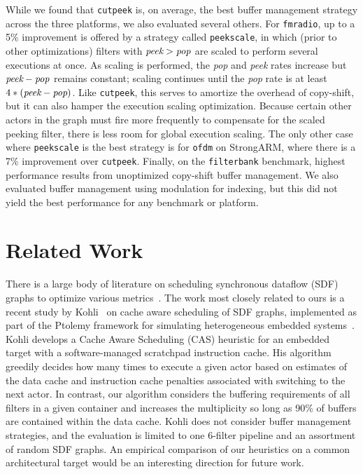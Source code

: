 \documentclass{sigplanconf}
\begin{document}
While we found that {\tt cutpeek} is, on average, the best buffer
management strategy across the three platforms, we also evaluated
several others.  For {\tt fmradio}, up to a 5\% improvement is offered
by a strategy called {\tt peekscale}, in which (prior to other
optimizations) filters with $\mbox{\it peek}>\mbox{\it pop}$ are
scaled to perform several executions at once.  As scaling is
performed, the {\it pop} and {\it peek} rates increase but $\mbox{{\it
peek}} - \mbox{\it pop}$ remains constant; scaling continues until the
{\it pop} rate is at least $4*(\mbox{{\it peek}} - \mbox{{\it pop}})$.
Like {\tt cutpeek}, this serves to amortize the overhead of
copy-shift, but it can also hamper the execution scaling optimization.
Because certain other actors in the graph must fire more frequently to
compensate for the scaled peeking filter, there is less room for
global execution scaling.  The only other case where {\tt peekscale}
is the best strategy is for {\tt ofdm} on StrongARM, where there is a
7\% improvement over {\tt cutpeek}.  Finally, on the {\tt filterbank}
benchmark, highest performance results from unoptimized copy-shift
buffer management.  We also evaluated buffer management using
modulation for indexing, but this did not yield the best performance
for any benchmark or platform.

\section{Related Work}
\label{sec:related-work}

There is a large body of literature on scheduling synchronous dataflow
(SDF) graphs to optimize various
metrics~\cite{bhattacharyya99synthesis,leesdf}.  The work most closely
related to ours is a recent study by Kohli~\cite{kohli04} on
cache aware scheduling of SDF graphs, implemented as part of the
Ptolemy framework for simulating heterogeneous embedded
systems~\cite{ptolemy03overview}.  Kohli develops a Cache Aware
Scheduling (CAS) heuristic for an embedded target with a
software-managed scratchpad instruction cache.  His algorithm greedily
decides how many times to execute a given actor based on estimates of
the data cache and instruction cache penalties associated with
switching to the next actor.  In contrast, our algorithm considers the
buffering requirements of all filters in a given container and
increases the multiplicity so long as 90\% of buffers are contained
within the data cache.  Kohli does not consider buffer management
strategies, and the evaluation is limited to one 6-filter pipeline and
an assortment of random SDF graphs.  An empirical comparison of our
heuristics on a common architectural target would be an interesting
direction for future work.
\end{document}
